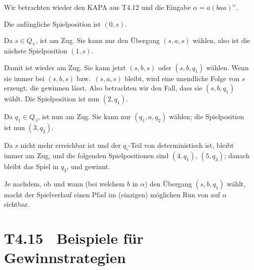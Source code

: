 \documentclass[fontsize=11pt, twoside=false, numbers=autoenddot]{scrbook}
\begin{document}
Wir betrachten wieder den KAPA \Amc aus T4.12 und die Eingabe $\alpha = a(baa)^\omega$.

Die anfängliche Spielposition ist $(0,s)$.

Da $s \in Q_\forall$, ist \PlA am Zug. Sie kann nur den Übergang $(s,a,s)$ wählen,
also ist die nächste Spielposition $(1,s)$.

Damit ist \PlA wieder am Zug. Sie kann jetzt $(s,b,s)$ oder $(s,b,q_1)$ wählen.
Wenn sie immer bei $(s,b,s)$ bzw.\ $(s,a,s)$ bleibt, wird eine unendliche Folge
von $s$ erzeugt, die \PlE gewinnen lässt.
Also betrachten wir den Fall, dass sie $(s,b,q_1)$ wählt.
Die Spielposition ist nun $(2,q_1)$.

Da $q_1 \in Q_\exists$, ist nun \PlE am Zug.
Sie kann nur $(q_1,a,q_2)$ wählen;
die Spielposition ist nun $(3,q_2)$.

Da $s$ nicht mehr erreichbar ist und der $q_i$-Teil von \Amc deterministisch ist,
bleibt immer \PlE am Zug, und die folgenden Spielpositionen sind
$(4,q_1)$, $(5,q_3)$; danach bleibt das Spiel in $q_3$, und \PlE gewinnt.

 Je nachdem, ob und wann (bei welchem $b$ in $\alpha$)
\PlA den Übergang $(s,b,q_1)$ wählt, macht der Spielverlauf
einen Pfad im (einzigen) möglichen Run von \Amc auf $\alpha$ sichtbar.

\section*{T4.15~ Beispiele für Gewinnstrategien}
\end{document}
